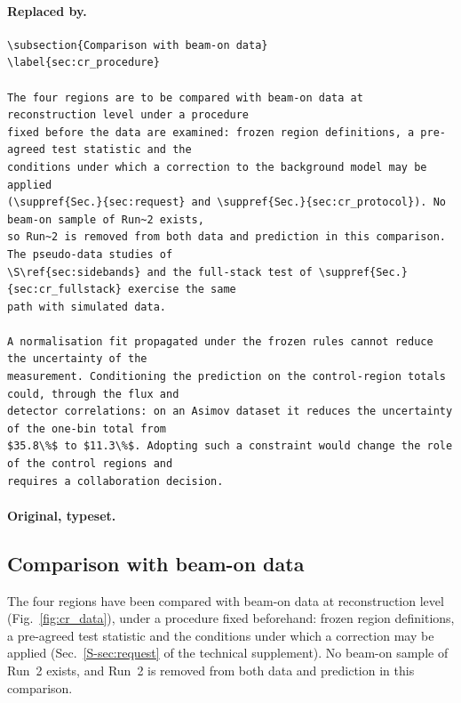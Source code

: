\documentclass[11pt,a4paper]{article}
\newcommand{\suppref}[2]{#1~\ref{S-#2} of the technical supplement}
\begin{document}
\paragraph{Replaced by.}
\begin{lstlisting}[language={[LaTeX]TeX},basicstyle=\ttfamily\footnotesize,columns=fullflexible]
\subsection{Comparison with beam-on data}
\label{sec:cr_procedure}

The four regions are to be compared with beam-on data at reconstruction level under a procedure
fixed before the data are examined: frozen region definitions, a pre-agreed test statistic and the
conditions under which a correction to the background model may be applied
(\suppref{Sec.}{sec:request} and \suppref{Sec.}{sec:cr_protocol}). No beam-on sample of Run~2 exists,
so Run~2 is removed from both data and prediction in this comparison. The pseudo-data studies of
\S\ref{sec:sidebands} and the full-stack test of \suppref{Sec.}{sec:cr_fullstack} exercise the same
path with simulated data.

A normalisation fit propagated under the frozen rules cannot reduce the uncertainty of the
measurement. Conditioning the prediction on the control-region totals could, through the flux and
detector correlations: on an Asimov dataset it reduces the uncertainty of the one-bin total from
$35.8\%$ to $11.3\%$. Adopting such a constraint would change the role of the control regions and
requires a collaboration decision.
\end{lstlisting}
\paragraph{Original, typeset.}
\begingroup
\subsection{Comparison with beam-on data}
\label{sec:cr_outcome}

The four regions have been compared with beam-on data at reconstruction level
(Fig.~\ref{fig:cr_data}), under a procedure fixed beforehand: frozen region definitions, a
pre-agreed test statistic and the conditions under which a correction may be applied
(\suppref{Sec.}{sec:request}). No beam-on sample of Run~2 exists, and Run~2 is removed from both data
and prediction in this comparison.
\end{document}
